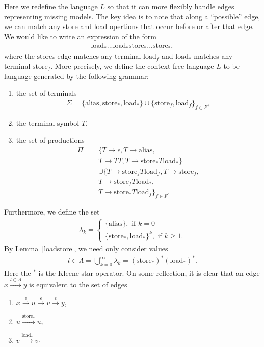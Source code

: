 \documentclass[10pt,twocolumn]{article}
\theoremstyle{definition}
\begin{document}
Here we redefine the language $L$ so that it can more flexibly handle edges representing missing models. The key idea is to note that along a ``possible'' edge, we can match any store and load opertions that occur before or after that edge. We would like to write an expression of the form
\begin{align*}
\text{load}_*...\text{load}_*\text{store}_*...\text{store}_*,
\end{align*}
where the $\text{store}_*$ edge matches any terminal $\text{load}_f$ and $\text{load}_*$ matches any terminal $\text{store}_f$. More precisely, we define the context-free language $L$ to be language generated by the following grammar:
\begin{enumerate}
\item the set of terminals
\begin{align*}
\Sigma=\{\text{alias},\text{store}_*,\text{load}_*\}\cup\{\text{store}_f,\text{load}_f\}_{f\in F},
\end{align*}
\item the terminal symbol $T$,
\item the set of productions
\begin{align*}
\Pi=&\{T\to\epsilon,T\to\text{alias},\\
&T\to TT,T\to\text{store}_*T\text{load}_*\}\\
&\cup\{T\to\text{store}_fT\text{load}_f,T\to\text{store}_f,\\
&T\to\text{store}_fT\text{load}_*,\\
&T\to\text{store}_*T\text{load}_f\}_{f\in F}.
\end{align*}
\end{enumerate}
Furthermore, we define the set
\begin{align*}
\lambda_k=
\begin{cases}
\{\text{alias}\},\text{ if }k=0\\
\{\text{store}_*,\text{load}_*\}^k,\text{ if }k\ge1.
\end{cases}
\end{align*}
By Lemma~\ref{loadstore}, we need only consider values
\begin{align*}
l\in\Lambda=\bigcup_{k=0}^\infty\lambda_k=(\text{store}_*)^*(\text{load}_*)^*.
\end{align*}
Here the $^*$ is the Kleene star operator. On some reflection, it is clear that an edge $x\xrightarrow{l\in\Lambda}y$ is equivalent to the set of edges
\begin{enumerate}
\item $x\xrightarrow{\epsilon}u\xrightarrow{\epsilon}v\xrightarrow{\epsilon}y$,
\item $u\xrightarrow{\text{store}_*}u$,
\item $v\xrightarrow{\text{load}_*}v$.
\end{enumerate}
\end{document}
